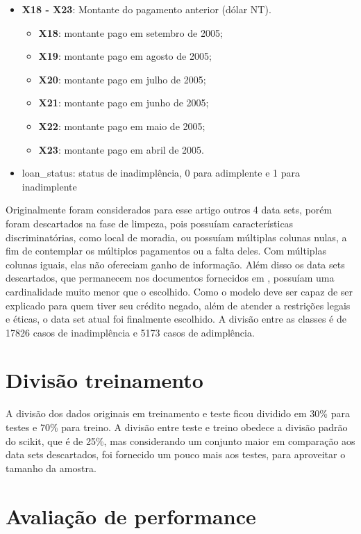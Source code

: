\documentclass[12pt]{article}
\begin{document}
\begin{itemize}
    \item \textbf{X18 - X23}: Montante do pagamento anterior (dólar NT).
    \begin{itemize}
        \item \textbf{X18}: montante pago em setembro de 2005;
        \item \textbf{X19}: montante pago em agosto de 2005;
        \item \textbf{X20}: montante pago em julho de 2005;
        \item \textbf{X21}: montante pago em junho de 2005;
        \item \textbf{X22}: montante pago em maio de 2005;
        \item \textbf{X23}: montante pago em abril de 2005.
    \end{itemize}
    \item loan\_status: status de inadimplência, 0 para adimplente e 1 para inadimplente
\end{itemize}

Originalmente foram considerados para esse artigo outros 4 data sets, porém foram descartados na fase de limpeza, pois possuíam características discriminatórias, como local de moradia, ou possuíam múltiplas colunas nulas, a fim de contemplar os múltiplos pagamentos ou a falta deles. Com múltiplas colunas iguais, elas não ofereciam ganho de informação. Além disso os data sets descartados, que permanecem nos documentos fornecidos em \cite{repositorio}, possuíam uma cardinalidade muito menor que o escolhido. Como o modelo deve ser capaz de ser explicado para quem tiver seu crédito negado, além de atender a restrições legais e éticas, o data set atual foi finalmente escolhido. A divisão entre as classes é de 17826 casos de inadimplência e 5173 casos de adimplência.

\section{Divisão treinamento}

A divisão dos dados originais em treinamento e teste ficou dividido em 30\% para testes e 70\% para treino. A divisão entre teste e treino obedece a divisão padrão do scikit, que é de 25\%, mas considerando um conjunto maior em comparação aos data sets descartados, foi fornecido um pouco mais aos testes, para aproveitar o tamanho da amostra.

\section{Avaliação de performance}
\end{document}
